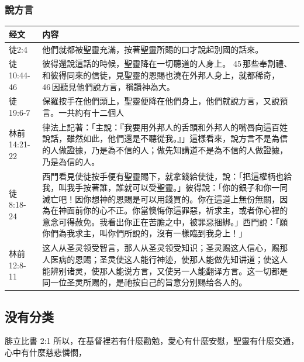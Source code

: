 \subsubsection{說方言}
\begin{table}[H]
\centering
\begin{tabular}{p{6em}|p{40em}}  \toprule
经文&内容\\  \midrule

徒2:4&他們就都被聖靈充滿，按著聖靈所賜的口才說起別國的話來。\\  \midrule

徒10:44-46&彼得還說這話的時候，聖靈降在一切聽道的人身上。 45 那些奉割禮、和彼得同來的信徒，見聖靈的恩賜也澆在外邦人身上，就都稀奇， 46 因聽見他們說方言，稱讚神為大。\\  \midrule
徒19:6-7&保羅按手在他們頭上，聖靈便降在他們身上，他們就說方言，又說預言。一共約有十二個人\\  \midrule
林前14:21-22&律法上記著：「主說：『我要用外邦人的舌頭和外邦人的嘴唇向這百姓說話，雖然如此，他們還是不聽從我。』」這樣看來，說方言不是為信的人做證據，乃是為不信的人；做先知講道不是為不信的人做證據，乃是為信的人。\\  \midrule
徒8:18-24&西門看見使徒按手便有聖靈賜下，就拿錢給使徒，說：「把這權柄也給我，叫我手按著誰，誰就可以受聖靈。」彼得說：「你的銀子和你一同滅亡吧！因你想神的恩賜是可以用錢買的。你在這道上無份無關，因為在神面前你的心不正。你當懊悔你這罪惡，祈求主，或者你心裡的意念可得赦免。我看出你正在苦膽之中，被罪惡捆綁。」西門說：「願你們為我求主，叫你們所說的，沒有一樣臨到我身上！」\\  \midrule

林前12:8-11&这人从圣灵领受智言，那人从圣灵领受知识；圣灵赐这人信心，赐那人医病的恩赐；圣灵使这人能行神迹，使那人能做先知讲道；使这人能辨别诸灵，使那人能说方言，又使另一人能翻译方言。这一切都是同一位圣灵所赐的，是祂按自己的旨意分别赐给各人的。\\  \midrule
\end{tabular}
\end{table}





\subsection{没有分类}
腓立比書 2:1
所以，在基督裡若有什麼勸勉，愛心有什麼安慰，聖靈有什麼交通，心中有什麼慈悲憐憫，

